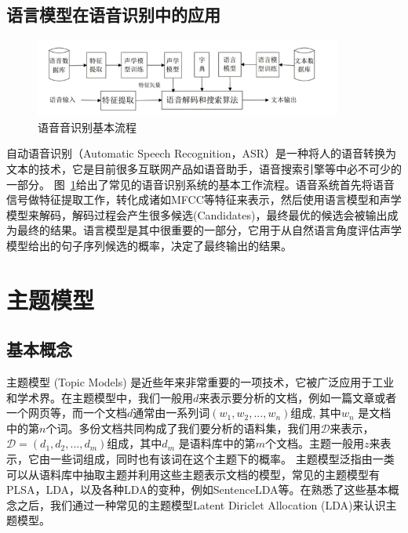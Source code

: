 \subsection{语言模型在语音识别中的应用}

\begin{figure}[h!]
	\begin{center}
		\includegraphics[width=0.9\textwidth]{img/chapter_lm/asr-pipeline2.png}
		\caption{语音音识别基本流程}
		\label{pic:asr}
	\end{center}
\end{figure}

自动语音识别（Automatic Speech Recognition，ASR）是一种将人的语音转换为文本的技术，它是目前很多互联网产品如语音助手，语音搜索引擎等中必不可少的一部分。
图~\ref{pic:asr}给出了常见的语音识别系统的基本工作流程。语音系统首先将语音信号做特征提取工作，转化成诸如MFCC等特征来表示，然后使用语言模型和声学模型来解码，解码过程会产生很多候选(Candidates)，最终最优的候选会被输出成为最终的结果。语言模型是其中很重要的一部分，它用于从自然语言角度评估声学模型给出的句子序列候选的概率，决定了最终输出的结果。 
\section{主题模型}

\subsection{基本概念}
主题模型 (Topic Models) 是近些年来非常重要的一项技术，它被广泛应用于工业和学术界。在主题模型中，我们一般用$d$来表示要分析的文档，例如一篇文章或者一个网页等，而一个文档$d$通常由一系列词$(w_1, w_2, ..., w_n)$组成, 其中$w_n$ 是文档中的第$n$个词。多份文档共同构成了我们要分析的语料集，我们用$\mathcal{D}$来表示，$\mathcal{D}=(d_1, d_2, ..., d_m)$组成，其中$d_m$ 是语料库中的第$m$个文档。主题一般用$z$来表示，它由一些词组成，同时也有该词在这个主题下的概率。
主题模型泛指由一类可以从语料库中抽取主题并利用这些主题表示文档的模型，常见的主题模型有PLSA，LDA，以及各种LDA的变种，例如SentenceLDA等。在熟悉了这些基本概念之后，我们通过一种常见的主题模型Latent Diriclet Allocation (LDA)来认识主题模型。




